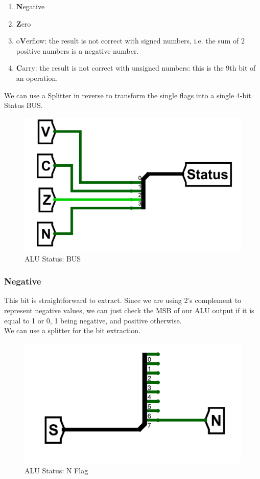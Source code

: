 \documentclass{article}
\begin{document}
\begin{enumerate}[start=0, before=\small, after=\normalsize, itemsep=2pt, parsep=0pt]
    \item \textbf{N}egative
    \item \textbf{Z}ero
    \item o\textbf{V}erflow: the result is not correct with
signed numbers, i.e. the sum of 2 positive numbers is a negative number.
    \item \textbf{C}arry: the result is not correct with unsigned numbers: this is the 9th bit of an
operation.
\end{enumerate}

We can use a Splitter in reverse to transform the single flags into a single 4-bit Status BUS.

\begin{figure}[H]
    \centering
    \includegraphics[width=.5\textwidth]{circuits/status_bus.png}
    \caption{ALU Status: BUS}
\end{figure}

\subsubsection{Negative}
This bit is straightforward to extract. Since we are using 2's complement to represent negative values, we can just check the MSB of our ALU output if it is equal to 1 or 0, 1 being negative, and positive otherwise. \\
We can use a splitter for the bit extraction.

\begin{figure}[H]
    \centering
    \includegraphics[width=.5\textwidth]{circuits/status_n.png}
    \caption{ALU Status: N Flag}
\end{figure}
\end{document}
